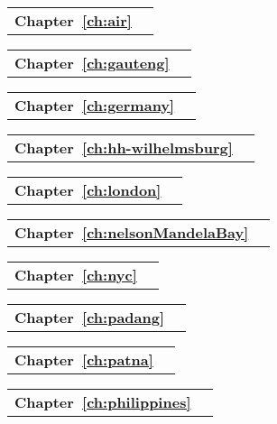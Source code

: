 \begin{tabular}[width=0.48\textwidth]{@{}l l}
\textbf{Chapter~\ref{ch:air}} &  \\
\end{tabular}

\begin{tabular}[width=0.48\textwidth]{@{}l l}
\textbf{Chapter~\ref{ch:gauteng}} &  \\
\end{tabular}

\begin{tabular}[width=0.48\textwidth]{@{}l l}
\textbf{Chapter~\ref{ch:germany}} &  \\
\end{tabular}

\begin{tabular}[width=0.48\textwidth]{@{}l l}
\textbf{Chapter~\ref{ch:hh-wilhelmsburg}} &  \\
\end{tabular}

\begin{tabular}[width=0.48\textwidth]{@{}l l}
\textbf{Chapter~\ref{ch:london}} &  \\
\end{tabular}

\begin{tabular}[width=0.48\textwidth]{@{}l l}
\textbf{Chapter~\ref{ch:nelsonMandelaBay}} &  \\
\end{tabular}

\begin{tabular}[width=0.48\textwidth]{@{}l l}
\textbf{Chapter~\ref{ch:nyc}} &  \\
\end{tabular}

\begin{tabular}[width=0.48\textwidth]{@{}l l}
\textbf{Chapter~\ref{ch:padang}} &  \\
\end{tabular}

\begin{tabular}[width=0.48\textwidth]{@{}l l}
\textbf{Chapter~\ref{ch:patna}} &  \\
\end{tabular}

\begin{tabular}[width=0.48\textwidth]{@{}l l}
\textbf{Chapter~\ref{ch:philippines}} &  \\
\end{tabular}

